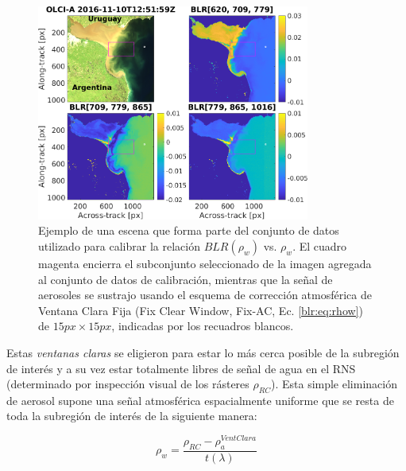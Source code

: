         \begin{figure}
        \centering
        \includegraphics[width=0.8\textwidth]{blr/figures/Blr14CalValDataSet}
        \caption[Ejemplo de una escena que forma parte del conjunto de datos utilizado para calibrar la relación $BLR(\rho_{w})$ vs. $\rho_{w}$.]{Ejemplo de una escena que forma parte del conjunto de datos utilizado para calibrar la relación $BLR(\rho_{w})$ vs. $\rho_{w}$. El cuadro magenta encierra el subconjunto seleccionado de la imagen agregada al conjunto de datos de calibración, mientras que la señal de aerosoles se sustrajo usando el esquema de corrección atmosférica de Ventana Clara Fija (Fix Clear Window, Fix-AC, Ec. \ref{blr:eq:rhow}) de $15 px \times 15 px$, indicadas por los recuadros blancos.}
        \label{blr:Blr14CalValDataSet}
        \end{figure}
        
        Estas \textit{ventanas claras} se eligieron para estar lo más cerca posible de la subregión de interés y a su vez estar totalmente libres de señal de agua en el RNS (determinado por inspección visual de los rásteres $\rho_{RC}$). Esta simple eliminación de aerosol supone una señal atmosférica espacialmente uniforme que se resta de toda la subregión de interés de la siguiente manera:
        
        \begin{equation}
            \rho_{w} = \frac{\rho_{RC} - \rho_{a}^{VentClara}}{t(\lambda)}
            \label{blr:eq:rhow}
        \end{equation}
        
